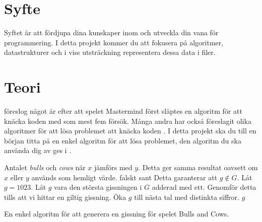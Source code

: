 \documentclass[a4paper]{miunasgn}
\theoremstyle{definition}
\begin{document}
\section{Syfte}
\noindent
Syftet är att fördjupa dina kunskaper inom och utveckla din vana för 
programmering.
I detta projekt kommer du att fokusera på algoritmer, datastrukturer och i viss 
utsträckning representera dessa data i filer.


\section{Teori}
\label{sec:Theory}
\noindent
\citet{Knuth1977tca} föreslog något år efter att spelet Mastermind först 
släptes en algoritm för att knäcka koden med som mest fem försök.
Många andra har också föreslagit olika algoritmer för att lösa problemet att 
knäcka koden 
\cite[exempelvis][]{Neuwirth1982ssf,Vomlel2004bni,Goddard2004mr,Kooi2005yam,Slovesnov2011soo}.
I detta projekt ska du till en början titta på en enkel algoritm för att lösa 
problemet, den algoritm du ska använda dig av ges 
i .

\begin{algorithm}[t]
	\begin{algorithmic}[1]
		\Statex
			\State\Return Antalet \emph{bulls} och \emph{cows} när \(x\) jämförs med 
			\(y\).
			\Comment Detta ger samma resultat oavsett om \(x\) eller \(y\) används 
			som hemligt värde.
		\EndFunction
		\Statex
					\State \Return falskt
				\EndIf
			\EndFor
			\State \Return sant
		\EndFunction
		\Statex
			\Comment Detta garanterar att \(g\not\in G\).
				\State Låt \(g = 1023\).
			\Else
				\State Låt \(g\) vara den största gissningen i \(G\) adderad med ett.
			\EndIf
			\Comment Genomför detta 
			tills att vi hittar en giltig gissning.
				\State Öka \(g\) till nästa tal med distinkta siffror.
			\EndWhile
			\State \Return \(g\)
		\EndFunction
	\end{algorithmic}
  \caption{En enkel algoritm för att generera en gissning för spelet Bulls and 
  Cows.}
	\label{alg:bullcow-simple}
\end{algorithm}
\end{document}
